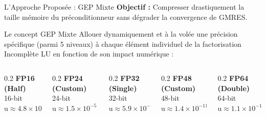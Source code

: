\documentclass[10pt,aspectratio=169]{beamer}
\begin{document}
\begin{frame}{L'Approche Proposée : GEP Mixte}
    \textbf{Objectif :} Compresser drastiquement la taille mémoire du préconditionneur sans dégrader la convergence de GMRES.
    
    \vspace{0.4cm}
    \begin{block}{Le concept GEP Mixte}
        Allouer dynamiquement et à la volée une précision spécifique (parmi 5 niveaux) à chaque élément individuel de la factorisation Incomplète LU en fonction de son impact numérique :
    \end{block}
    
    \vspace{0.2cm}
    \begin{columns}
        \begin{column}{0.2\textwidth}
            \centering
            \textbf{FP16 (Half)} \\ 16-bit \\ $\text{u} \approx 4.8 \times 10^{-4}$
        \end{column}
        \begin{column}{0.2\textwidth}
            \centering
            \textbf{FP24 (Custom)} \\ 24-bit \\ $\text{u} \approx 1.5 \times 10^{-5}$
        \end{column}
        \begin{column}{0.2\textwidth}
            \centering
            \textbf{FP32 (Single)} \\ 32-bit \\ $\text{u} \approx 5.9 \times 10^{-8}$
        \end{column}
        \begin{column}{0.2\textwidth}
            \centering
            \textbf{FP48 (Custom)} \\ 48-bit \\ $\text{u} \approx 1.4 \times 10^{-11}$
        \end{column}
        \begin{column}{0.2\textwidth}
            \centering
            \textbf{FP64 (Double)} \\ 64-bit \\ $\text{u} \approx 1.1 \times 10^{-16}$
        \end{column}
    \end{columns}
\end{frame}
\end{document}

